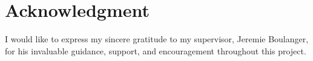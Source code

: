 \section*{Acknowledgment}
I would like to express my sincere gratitude to my supervisor, Jeremie Boulanger, for his invaluable guidance, support, and encouragement throughout this project.